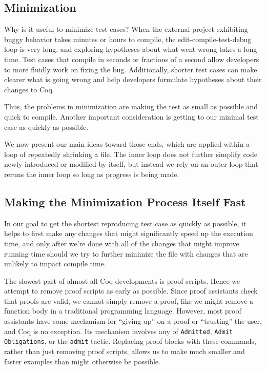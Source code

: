 \documentclass[a4paper,USenglish,cleveref,autoref,thm-restate]{lipics-v2021}
\begin{document}
\subsection{Minimization}

Why is it useful to minimize test cases?
When the external project exhibiting buggy behavior takes minutes or hours to compile, the edit-compile-test-debug loop is very long, and exploring hypotheses about what went wrong takes a long time.
Test cases that compile in seconds or fractions of a second allow developers to more fluidly work on fixing the bug.
Additionally, shorter test cases can make clearer what is going wrong and help developers formulate hypotheses about their changes to Coq.

Thus, the problems in minimization are making the test as small as possible and quick to compile. 
Another important consideration is getting to our minimal test case as quickly as possible.

We now present our main ideas toward those ends, which are applied within a loop of repeatedly shrinking a file.
The inner loop does not further simplify code newly introduced or modified by itself, but instead we rely on an outer loop that reruns the inner loop so long as progress is being made.

\subsection{Making the Minimization Process Itself Fast}

In our goal to get the shortest reproducing test case as quickly as possible, it helps to first make any changes that might significantly speed up the execution time, and only after we're done with all of the changes that might improve running time should we try to further minimize the file with changes that are unlikely to impact compile time.

The slowest part of almost all Coq developments is proof scripts.
Hence we attempt to remove proof scripts as early as possible.
Since proof assistants check that proofs are valid, we cannot simply remove a proof, like we might remove a function body in a traditional programming language.
However, most proof assistants have some mechanism for ``giving up'' on a proof or ``trusting'' the user, and Coq is no exception.
Its mechanism involves any of \verb|Admitted|, \verb|Admit Obligations|, or the \verb|admit| tactic.
Replacing proof blocks with these commands, rather than just removing proof scripts, allows us to make much smaller and faster examples than might otherwise be possible.
\end{document}
